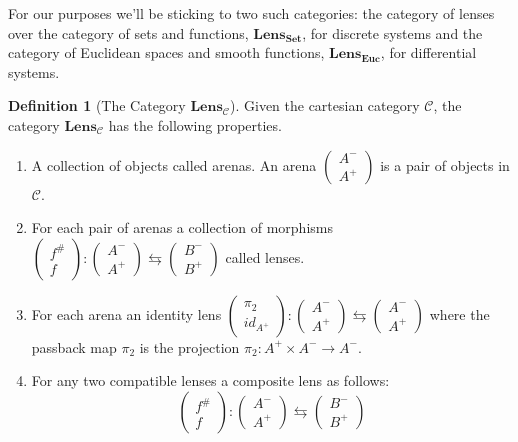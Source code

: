 \documentclass{article}
\theoremstyle{definition}
\newtheorem{definition}{Definition}
\begin{document}
For our purposes we'll be sticking to two such categories: the category of lenses over the category of sets and functions, $\textbf{Lens}_{\textbf{Set}}$, for discrete systems and the category of Euclidean spaces and smooth functions, $\textbf{Lens}_\textbf{Euc}$, for differential systems.

\begin{definition}[The Category $\textbf{Lens}_\mathcal{C}$]
    Given the cartesian category $\mathcal{C}$, the category $\textbf{Lens}_{\mathcal{C}}$ has the following properties.
    \begin{enumerate}
        \item A collection of objects called arenas. An arena $\begin{pmatrix}A^-\\A^+\end{pmatrix}$ is a pair of objects in $\mathcal{C}$.
        \item For each pair of arenas a collection of morphisms $\begin{pmatrix}f^{\#}\\f\end{pmatrix}:\begin{pmatrix}A^-\\A^+\end{pmatrix}\leftrightarrows\begin{pmatrix}B^-\\B^+\end{pmatrix}$ called lenses.
        \item For each arena an identity lens $\begin{pmatrix}\pi_2\\id_{A^+}\end{pmatrix}:\begin{pmatrix}A^-\\A^+\end{pmatrix}\leftrightarrows\begin{pmatrix}A^-\\A^+\end{pmatrix}$ where the passback map $\pi_2$ is the projection $\pi_2:A^+ \times A^- \rightarrow A^-$.
        \item For any two compatible lenses a composite lens as follows:
              $$\begin{pmatrix}f^{\#}\\f\end{pmatrix}:\begin{pmatrix}A^-\\A^+\end{pmatrix}\leftrightarrows\begin{pmatrix}B^-\\B^+\end{pmatrix}$$

\end{enumerate}
\end{definition}
\end{document}
